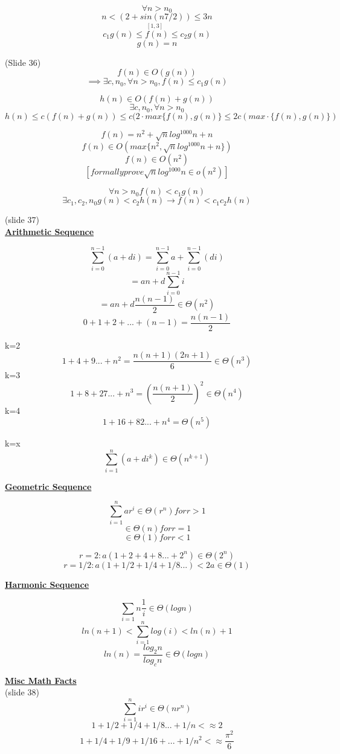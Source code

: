\documentclass[12pt]{article}
\newcommand{\myt}[1]{\textbf{\underline{#1}}}
\begin{document}
		$$\forall n > n_0$$
		$$n < \underset{[1,3]}{(2 + sin(n7/2))} \leq 3n$$
		$$c_1g(n) \leq f(n) \leq c_2g(n)$$
		$$g(n) = n$$
		
		(Slide 36)\\
		
		$$f(n) \in O(g(n))$$
		$$\implies \exists c, n_0, \forall n > n_0, f(n) \leq c_1g(n)$$
		
		$$h(n) \in O(f(n) + g(n))$$
		$$\exists c,n_0, \forall n > n_0$$
		$$h(n) \leq c(f(n) + g(n)) \leq c(2\cdot max\{f(n),g(n)\} \leq 2c(max\cdot\{f(n),g(n)\})$$
		
		$$f(n) = n^2 + \sqrt{n}log^{1000}n + n$$
		$$f(n) \in O(max \{n^2, \sqrt{n}log^{1000}n + n\})$$
		$$f(n) \in O(n^2)$$
		$$[formally prove \sqrt{n}log^{1000}n \in o(n^2)]$$
		
		$$\forall n > n_0 f(n) < c_1g(n)$$
		$$\exists c_1, c_2, n_0 g(n) < c_2h(n) \rightarrow f(n) < c_1 c_2 h(n)$$
		
		(slide 37)\\
		
		\myt{Arithmetic Sequence}
		
		$$\sum_{i=0}^{n-1}(a+di) = \sum_{i=0}^{n-1}a + \sum_{i=0}^{n-1}(di)$$
		$$= an + d\sum_{i=0}^{n-1}i$$
		$$= an + d\frac{n(n-1)}{2} \in \Theta(n^2)$$
		$$0 + 1 + 2 + ... + (n-1) = \frac{n(n-1)}{2}$$
		
		k=2$$1 + 4 + 9... + n^2 = \frac{n(n+1)(2n + 1)}{6} \in \Theta(n^3)$$
		k=3$$1 + 8 + 27...+ n^3 = (\frac{n(n+1)}{2})^2 \in \Theta(n^4)$$
		k=4$$1 + 16 + 82...+n^4 = \Theta(n^5)$$
		
		k=x$$\sum_{i=1}^{n}(a+di^k) \in \Theta(n^{k+1})$$
		
		\myt{Geometric Sequence}
		
		$$\sum_{i=1}^{n}ar^i \in \Theta(r^n) for r > 1$$
		$$\in \Theta(n) for r = 1$$
		$$\in \Theta(1) for r < 1$$
		
		$$r=2:a(1+2+4+8...+2^n) \in \Theta(2^n)$$
		$$r=1/2: a(1+1/2+1/4+1/8 ...) < 2a \in \Theta(1)$$
		
		\myt{Harmonic Sequence}
		
		$$\sum_{i=1}{n}\frac{1}{i} \in \Theta(logn)$$
		$$ln(n+1) < \sum_{i=1}^{n}log(i) < ln(n) + 1$$
		$$ln(n) = \frac{log_2n}{log_cn} \in \Theta (logn)$$
		
		\myt{Misc Math Facts}\\
		(slide 38)\\
		
		$$\sum_{i=1}^{n}ir^i \in \Theta(nr^n)$$
		$$1+1/2+1/4+1/8 ... + 1/n <\approx 2$$
		$$1+1/4+1/9+1/16+...+1/n^2 <\approx \frac{\pi^2}{6}$$
		
\end{document}
